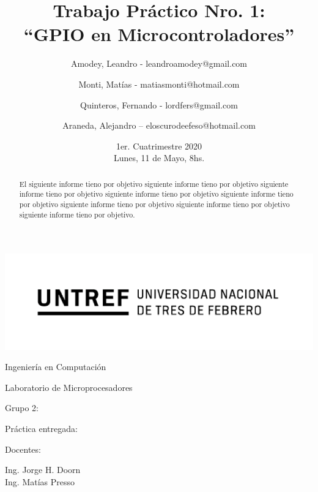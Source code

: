 \documentclass{article}
\title{Trabajo Práctico Nro. 1:\\“GPIO en Microcontroladores”}
\author{Amodey, Leandro - leandroamodey@gmail.com
\and Monti, Matías - matiasmonti@hotmail.com
\and Quinteros, Fernando - lordfers@gmail.com
\and Araneda, Alejandro – eloscurodeefeso@hotmail.com}
\date{1er. Cuatrimestre 2020\\Lunes, 11 de Mayo, 8hs.}
\def\teacher{Ing. Jorge H. Doorn\\Ing. Matías Presso}
\begin{document}
\begin{titlepage}
\makeatletter 
\centering
\includegraphics{logo.png}\par
{\Large Ingeniería en Computación \par}
\vspace{0.5cm}
{\LARGE Laboratorio de Microprocesadores \par}
\vfill
{\huge \@title \par}
\vfill
Grupo 2:\par
\begin{center}
{\renewcommand{\and}{\par}\@author}
\end{center}
\vfill
Práctica entregada:\par
\@date
\vfill
Docentes:\par
\teacher
\vspace{1cm}
\makeatother
\end{titlepage}

\renewcommand{\abstractname}{Resumen}
\begin{abstract}
El siguiente informe tieno por objetivo siguiente informe tieno por objetivo siguiente informe tieno por objetivo siguiente informe tieno por objetivo siguiente informe tieno por objetivo siguiente informe tieno por objetivo siguiente informe tieno por objetivo siguiente informe tieno por objetivo.
\end{abstract}
\end{document}
